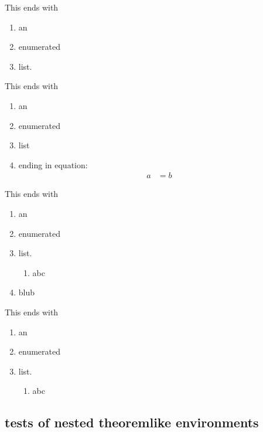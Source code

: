 \documentclass[leqno]{article}
\begin{document}
\begin{theorem}
  This ends with
  \begin{enumerate}
  \item an
  \item enumerated
  \item list.
  \end{enumerate}
\end{theorem}

\begin{theorem}
  This ends with
  \begin{enumerate}
  \item an
  \item enumerated
  \item list
  \item ending in equation:
  \begin{align*}
  a&=b
  \end{align*}
  \end{enumerate}
\end{theorem}

\begin{theorem}
  This ends with
  \begin{enumerate}
  \item an
  \item enumerated
  \item list.
  \begin{enumerate}
  \item abc
  \end{enumerate}
  \item blub
  \end{enumerate}
\end{theorem}

\begin{theorem}
  This ends with
  \begin{enumerate}
  \item an
  \item enumerated
  \item list.
  \begin{enumerate}
  \item abc
  \end{enumerate}
  \end{enumerate}
\end{theorem}

\subsection{tests of nested theoremlike environments}
\end{document}
